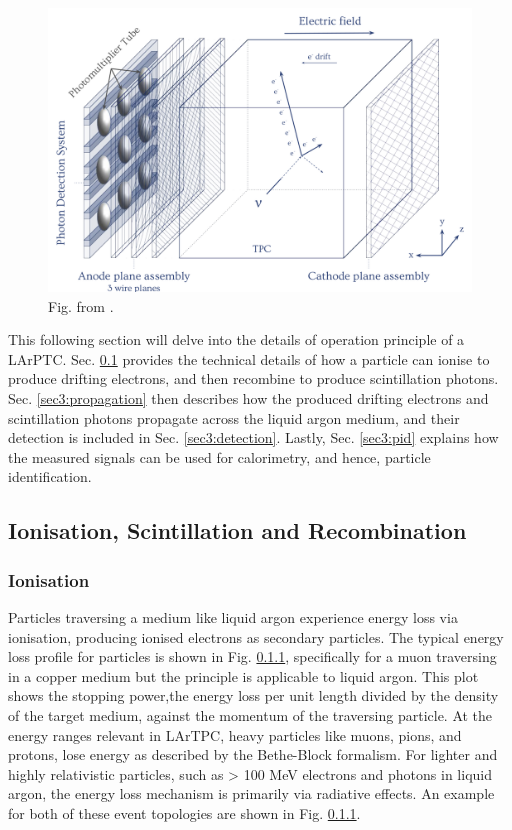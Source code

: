 \begin{figure}[h] 
\centering    
\includegraphics[width=1.0\textwidth]{LARTPC}
\caption[LARTPC]{
	Fig. from \cite{}.
}
\label{fig:LARTPC}
\end{figure}

This following section will delve into the details of operation principle of a LArPTC.
Sec. \ref{sec3:creation} provides the technical details of how a particle can ionise to produce drifting electrons, and then recombine to produce scintillation photons.
Sec. \ref{sec3:propagation} then describes how the produced drifting electrons and scintillation photons propagate across the liquid argon medium, and their detection is included in Sec. \ref{sec3:detection}.
Lastly, Sec. \ref{sec3:pid} explains how the measured signals can be used for calorimetry, and hence, particle identification.

\subsection{Ionisation, Scintillation and Recombination}
\label{sec3:creation}

\subsubsection{Ionisation}
Particles traversing a medium like liquid argon experience energy loss via ionisation, producing ionised electrons as secondary particles. 
The typical energy loss profile for particles is shown in Fig. \ref{}, specifically for a muon traversing in a copper medium but the principle is applicable to liquid argon.
This plot shows the stopping power,the energy loss per unit length divided by the density of the target medium, against the momentum of the traversing particle.
At the energy ranges relevant in LArTPC, heavy particles like muons, pions, and protons, lose energy as described by the Bethe-Block formalism.
For lighter and highly relativistic particles, such as > 100 MeV electrons and photons in liquid argon, the energy loss mechanism is primarily via radiative effects.
An example for both of these event topologies are shown in Fig. \ref{}.


